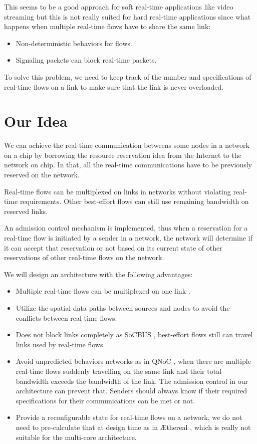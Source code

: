 \documentclass[10pt]{article}
\begin{document}
This seems to be a good approach for soft real-time applications like video streaming
but this is not really suited for hard real-time applications since what happens 
when multiple real-time flows have to share the same link:
\begin{itemize}
\item Non-deterministic behaviors for flows.
\item Signaling packets can block real-time packets.
\end{itemize}
To solve this problem, we need to keep track of the number and specifications of
real-time flows on a link to make sure that the link is never overloaded.

\section{Our Idea}
We can achieve the real-time communication betweens some nodes in a network 
on a chip by borrowing the resource reservation idea \cite{Zhang93rsvp} from the 
Internet to the network on chip. In that, all the real-time communications 
have to be previously reserved on the network. 

Real-time flows can be multiplexed \cite{Ferrari90ascheme, Zhang_1service} on links in networks without violating
real-time requirements. Other best-effort flows can still use remaining bandwidth on reserved links.

An admission control mechanism is implemented, thus when a reservation 
for a real-time flow is initiated by a sender in a network, the network will determine if 
it can accept that reservation or not based on its current state of other 
reservations of other real-time flows on the network.

We will design an architecture with the following advantages:
\begin{itemize}
\item Multiple real-time flows can be multiplexed on one link \cite{Ferrari90ascheme}.
\item Utilize the spatial data paths between sources and nodes to avoid the 
conflicts between real-time flows.
\item Does not block links completely as SoCBUS \cite{SoCBUS}, best-effort flows 
still can travel links used by real-time flows.
\item Avoid unpredicted behaviors networks as in QNoC \cite{QNoC}, when there are 
multiple real-time flows suddenly travelling on the same link and their total bandwidth 
exceeds the bandwidth of the link. The admission control in our architecture can 
prevent that. Senders should always know if their required specifications for 
their communications can be met or not. 
\item Provide a reconfigurable state for real-time flows on a network, we do not 
need to pre-calculate that at design time as in \AE thereal \cite{Goossens_chapter4}, 
which is really not suitable for the multi-core architecture.
\end{itemize}
\end{document}
